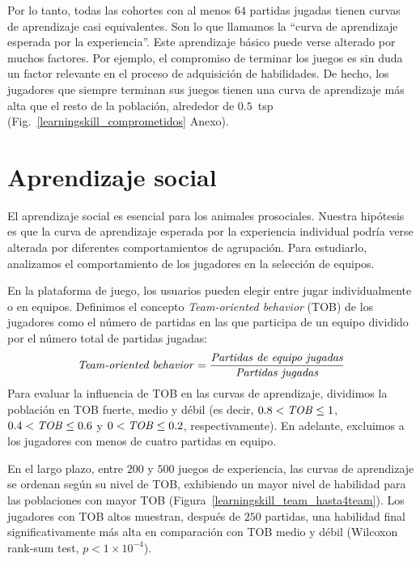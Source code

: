 \documentclass[a4paper,11pt]{book}
\theoremstyle{definition}
\begin{document}
Por lo tanto, todas las cohortes con al menos $64$ partidas jugadas tienen curvas de aprendizaje casi equivalentes.
%
Son lo que llamamos la ``curva de aprendizaje esperada por la experiencia''.
%
Este aprendizaje b\'asico puede verse alterado por muchos factores.
%
Por ejemplo, el compromiso de terminar los juegos es sin duda un factor relevante en el proceso de adquisici\'on de habilidades.
%
De hecho, los jugadores que siempre terminan sus juegos tienen una curva de aprendizaje m\'as alta que el resto de la poblaci\'on, alrededor de $0.5$~tsp (Fig.~\ref{learningskill_comprometidos} Anexo).

\section{Aprendizaje social}

El aprendizaje social es esencial para los animales prosociales.
%
Nuestra hip\'otesis es que la curva de aprendizaje esperada por la experiencia individual podr\'ia verse alterada por diferentes comportamientos de agrupaci\'on.
%
Para estudiarlo, analizamos el comportamiento de los jugadores en la selecci\'on de equipos.


En la plataforma de juego, los usuarios pueden elegir entre jugar individualmente o en equipos.
%
Definimos el concepto \emph{Team-oriented behavior} (TOB) de los jugadores como el n\'umero de partidas en las que participa de un equipo dividido por el n\'umero total de partidas jugadas:
%
\begin{equation}
\text{\emph{Team-oriented behavior}} = \frac{\text{\emph{Partidas de equipo jugadas}}}{\text{\emph{Partidas jugadas}}}
\end{equation}
%
Para evaluar la influencia de TOB en las curvas de aprendizaje, dividimos la poblaci\'on en TOB fuerte, medio y d\'ebil (es decir, $0.8<\text{\emph{TOB}}\leq 1$, $0.4 <\text{\emph{TOB}}\leq 0.6$ y $0 <\text{\emph{TOB}}\leq 0.2$, respectivamente).
%
En adelante, excluimos a los jugadores con menos de cuatro partidas en equipo.


En el largo plazo, entre $200$ y $500$ juegos de experiencia, las curvas de aprendizaje se ordenan seg\'un su nivel de TOB, exhibiendo un mayor nivel de habilidad para las poblaciones con mayor TOB (Figura~\ref{learningskill_team_hasta4team}).
%
Los jugadores con TOB altos muestran, despu\'es de $250$ partidas, una habilidad final significativamente m\'as alta en comparaci\'on con TOB medio y d\'ebil (Wilcoxon rank-sum test, $p<1 \times10^{-4}$).
\end{document}
